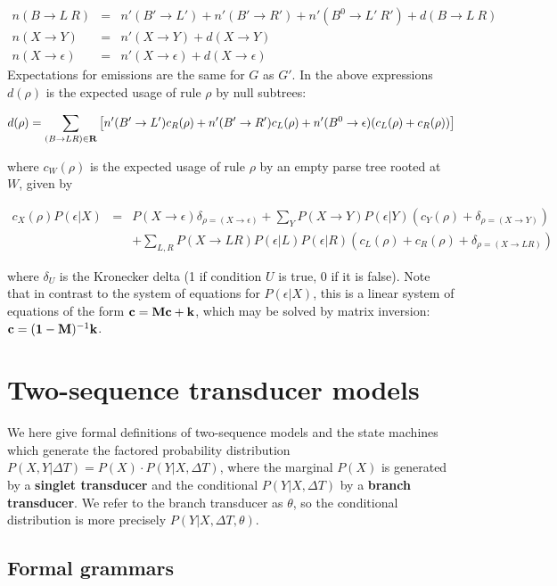 \documentclass[10pt]{article}
\begin{document}
\begin{eqnarray*}
    n(B \to L\ R) & = & n'(B' \to L') + n'(B' \to R') + n'(B^0 \to L'\ R') + d(B \to L\ R) \\
       n(X \to Y) & = & n'(X \to Y) + d(X \to Y) \\
n(X \to \epsilon) & = & n'(X \to \epsilon) + d(X \to \epsilon)
\end{eqnarray*}
Expectations for emissions are the same for $G$ as $G'$.
In the above expressions $d(\rho)$ is the expected usage of rule $\rho$ by null subtrees:

\[
d(\rho) = \sum_{(B \to LR) \in {\bf R}} \left[
n'(B' \to L') c_R(\rho)
+ n'(B' \to R') c_L(\rho)
+ n'(B^0 \to \epsilon) (c_L(\rho) + c_R(\rho))
\right]
\]

where $c_W(\rho)$ is the expected usage of rule $\rho$ by an empty parse tree rooted at $W$,
given by

\begin{eqnarray*}
c_X(\rho) P(\epsilon | X) & = & P(X \to \epsilon) \delta_{\rho=(X \to \epsilon)}
 + \sum_Y P(X \to Y) P(\epsilon|Y) \left( c_Y(\rho) + \delta_{\rho=(X \to Y)} \right)
\\ & &
 + \sum_{L,R} P(X \to LR) P(\epsilon|L) P(\epsilon|R) \left( c_L(\rho) + c_R(\rho) + \delta_{\rho=(X \to LR)} \right)
\end{eqnarray*}

where $\delta_U$ is the Kronecker delta (1 if condition $U$ is true, 0 if it is false).
Note that in contrast to the system of equations for $P(\epsilon|X)$, this is a linear system of equations
of the form ${\bf c} = {\bf Mc} + {\bf k}$, which may be solved by matrix inversion:
${\bf c} = ({\bf 1}-{\bf M})^{-1} {\bf k}$.



\newpage
\section{Two-sequence transducer models}

We here give formal definitions of two-sequence models and the state machines which
generate the factored probability distribution $P (X, Y | \Delta T) = P (X) \cdot P (Y | X, \Delta T)$,
where the marginal $P(X)$ is generated by a {\bf singlet transducer}
and the conditional $P (Y | X, \Delta T)$ by a {\bf branch transducer}.
We refer to the branch transducer as $\theta$, so the conditional distribution
is more precisely $P (Y | X, \Delta T, \theta)$.


\subsection{Formal grammars} 
\end{document}
